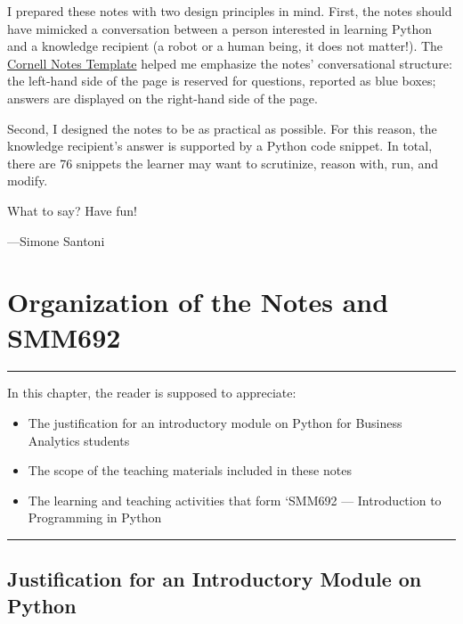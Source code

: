 \documentclass[a4paper,11pt]{book}
\begin{document}
\quad I prepared these notes with two design principles in mind. First, the notes should have mimicked a conversation between a person interested in learning Python and a knowledge recipient (a robot or a human being, it does not matter!).  The \href{https://en.wikipedia.org/wiki/Cornell_Notes}{Cornell Notes Template} helped me emphasize the notes' conversational structure: the left-hand side of the page is reserved for questions, reported as blue boxes; answers are displayed on the right-hand side of the page.

\quad Second, I designed the notes to be as practical as possible. For this reason, the knowledge recipient's answer is supported by a Python code snippet. In total, there are 76 snippets the learner may want to scrutinize, reason with, run, and modify.



\quad What to say? Have fun!

\vspace{2em}

---Simone Santoni


\chapter{Organization of the Notes and SMM692}
\label{ch:organization}
\par\noindent\rule{\textwidth}{0.4pt}

In this chapter, the reader is supposed to appreciate:

\begin{itemize}
	\item The justification for an introductory module on Python for Business Analytics students
	\item The scope of the teaching materials included in these notes 
	\item The learning and teaching activities that form `SMM692 --- Introduction to Programming in Python
\end{itemize}

\par\noindent\rule{\textwidth}{0.4pt}

\vspace{1em}

\section{Justification for an Introductory Module on Python}
\end{document}
